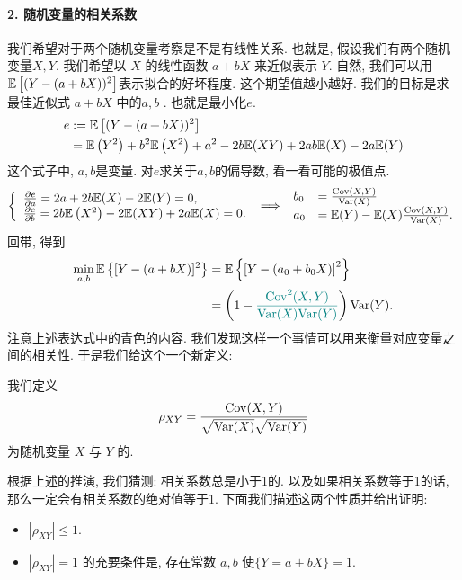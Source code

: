 \paragraph{2. 随机变量的相关系数} 我们希望对于两个随机变量考察是不是有线性关系. 也就是, 假设我们有两个随机变量$X,Y$. 我们希望以 $X$ 的线性函数 $a+b X$ 来近似表示 $Y$. 自然, 我们可以用$\mathbb E\left[(Y-(a+b X))^2\right]$表示拟合的好坏程度. 这个期望值越小越好. 我们的目标是求最佳近似式 $a+b X$ 中的$a,b$ .
也就是最小化$e$.
 $$
\begin{aligned}
e & :=\mathbb E\left[(Y-(a+b X))^2\right] \\
& =\mathbb E\left(Y^2\right)+b^2 \mathbb E\left(X^2\right)+a^2-2 b \mathbb E(X Y)+2 a b \mathbb E(X)-2 a \mathbb E(Y)
\end{aligned}
$$
这个式子中, $a,b$是变量. 对$e$求关于$a,b $的偏导数, 看一看可能的极值点.
$$
\left\{\begin{array}{l}
\frac{\partial e}{\partial a}=2 a+2 b \mathbb E(X)-2 \mathbb E(Y)=0, \\
\frac{\partial e}{\partial b}=2 b \mathbb E\left(X^2\right)-2 \mathbb E(X Y)+2 a \mathbb E(X)=0 .
\end{array}\right. \implies \begin{array}{ll}
b_0 & =\frac{\operatorname{Cov}(X, Y)}{\operatorname{Var}(X)} \\
a_0 & =\mathbb E(Y)-\mathbb E(X) \frac{\operatorname{Cov}(X, Y)}{\operatorname{Var}(X)} .
\end{array}
$$
回带, 得到
$$
\begin{aligned}
\min _{a, b} \mathbb E\left\{[Y-(a+b X)]^2\right\} & =\mathbb E\left\{\left[Y-\left(a_0+b_0 X\right)\right]^2\right\} \\
& =\left(1-{{\color{teal}\frac{\operatorname{Cov}^2(X, Y)}{{\operatorname{Var}(X)} {\operatorname{Var}(Y)}}}}\right) \operatorname{Var}(Y)  .
\end{aligned}
$$
注意上述表达式中的青色的内容. 我们发现这样一个事情可以用来衡量对应变量之间的相关性. 于是我们给这个一个新定义: 

\begin{definition}
    我们定义
    $$
    \rho_{X Y}=\frac{\operatorname{Cov}(X, Y)}{\sqrt{\operatorname{Var}(X)} \sqrt{\operatorname{Var}(Y)}}
    $$
    为随机变量 $X$ 与 $Y$ 的.
\end{definition}

根据上述的推演, 我们猜测: 相关系数总是小于1的. 以及如果相关系数等于1的话, 那么一定会有相关系数的绝对值等于1. 下面我们描述这两个性质并给出证明: 

\begin{itemize}
    \item $\left|\rho_{X Y}\right| \leq 1$.
    \item $\left|\rho_{X Y}\right|=1$ 的充要条件是, 存在常数 $a, b$ 使$\{Y=a+b X\}=1$.
\end{itemize}


